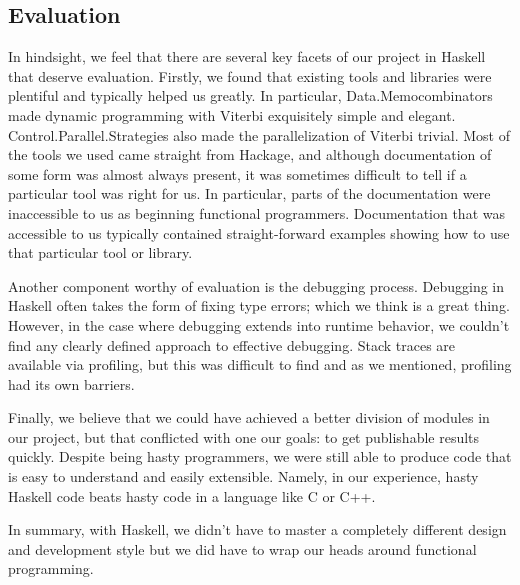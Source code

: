 \documentclass[preprint,nonatbib,blockstyle,nocopyrightspace,times]{sigplanconf}
\begin{document}
\subsection{Evaluation}
In hindsight, we feel that there are several key facets of our project in 
Haskell that deserve evaluation.
Firstly, we found that existing tools and libraries were plentiful and 
typically helped us greatly.
In particular, Data.Memocombinators made dynamic 
programming with Viterbi exquisitely simple and elegant.
Control.Parallel.Strategies also made the parallelization of Viterbi trivial.
Most of the tools we used came straight from Hackage, and although 
documentation of some form was almost always present, it was sometimes 
difficult to tell if a particular tool was right for us.
In particular, parts of the documentation were inaccessible to us as beginning 
functional programmers.
Documentation that was accessible to us typically contained straight-forward 
examples showing how to use that particular tool or library.

Another component worthy of evaluation is the debugging process.
Debugging in Haskell often takes the form of fixing type errors; which we think 
is a great thing.
However, in the case where debugging extends into runtime behavior, we couldn't 
find any clearly defined approach to effective debugging.
Stack traces are available via profiling, but this was difficult to find and 
as we mentioned, profiling had its own barriers.

Finally, we believe that we could have achieved a better division of modules in 
our project, but that conflicted with one our goals: to get publishable results
quickly. Despite being hasty programmers, we were still able to produce code 
that is easy to understand and easily extensible. Namely, in our experience, 
hasty Haskell code beats hasty code in a language like C or C++.

In summary, with Haskell, we didn't have to master a completely different 
design and development style but we did have to wrap our heads around 
functional programming.


%  
%  
%  
\end{document}
